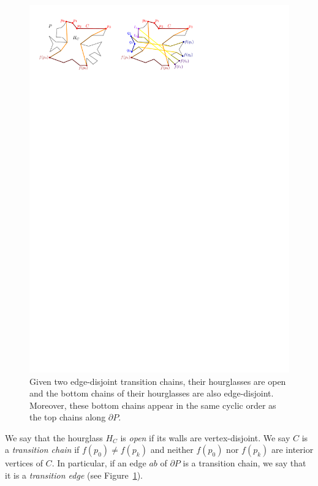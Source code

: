 \documentclass[a4paper,UKenglish]{lipics}
\newcommand{\ff}[1]{\ensuremath{f(#1)}}
\begin{document}
\begin{figure}[tb]
\centering
\includegraphics{img/TransitionChains.pdf}
\caption{\small Given two edge-disjoint transition chains, their hourglasses are open and
the bottom chains of their hourglasses are also edge-disjoint. 
Moreover, these bottom chains appear in the same cyclic order as the top chains along $\partial P$.}
\label{fig:Transition chains and hourglasses}
\end{figure}

We say that the hourglass $H_C$ is \emph{open} if its walls are vertex-disjoint. 
We say $C$ is a \emph{transition chain} if $\ff{p_0} \neq \ff{p_k}$ and neither $\ff{p_0}$ nor $\ff{p_k}$ are interior vertices of $C$. In particular, if an edge $ab$ of $\partial P$ is a transition chain, we say that it is a \emph{transition edge} (see Figure~\ref{fig:Transition chains and hourglasses}).
\end{document}
